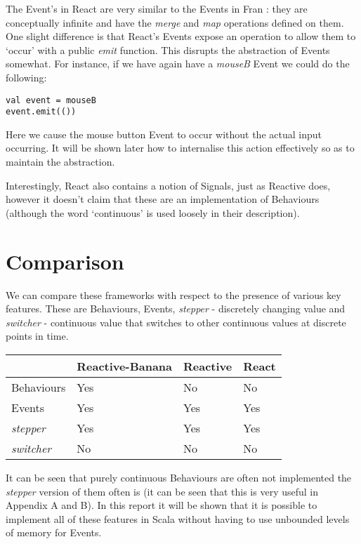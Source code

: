       The Event's in React are very similar to the Events in Fran \cite{Elliott1997}: they are conceptually infinite
      and have the \emph{merge} and \emph{map} operations defined on them. One slight difference is that React's
      Events expose an operation to allow them to `occur' with a public \emph{emit} function. This disrupts
      the abstraction of Events somewhat. For instance, if we have again have a \emph{mouseB} Event we could do the following:

\begin{verbatim}
val event = mouseB
event.emit(())
\end{verbatim}      

      Here we cause the mouse button Event to occur without the actual input occurring. It will be shown later how to     
      internalise this action effectively so as to maintain the abstraction. 

      Interestingly, React also contains a notion of Signals, just as Reactive does, 
      however it doesn't claim that these are an implementation of Behaviours (although the word `continuous' is
      used loosely in their description). 
      
\section{Comparison}
  We can compare these frameworks with respect to the presence of various key features. These are Behaviours, Events, 
  \emph{stepper} - discretely 
  changing value and \emph{switcher} - continuous value that switches to other continuous values at discrete points in time.
  
  \begin{center}
     \begin{tabular}{ | l | l | l | l | }
       \hline
        & Reactive-Banana & Reactive & React \\ \hline \hline
       Behaviours & Yes & No & No \\ \hline
       Events & Yes & Yes & Yes \\ \hline
       \emph{stepper} & Yes & Yes & Yes \\ \hline
       \emph{switcher} & No & No & No \\ \hline  
       \hline
     \end{tabular}
   \end{center}
   
   It can be seen that purely continuous Behaviours are often not implemented the \emph{stepper} version
   of them often is (it can be seen that this is very useful in Appendix A and B). In this report it will
   be shown that it is possible to implement all of these features in Scala without having to use unbounded levels
   of memory for Events.